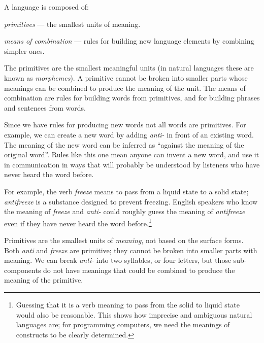 A language is composed of:
\begin{itemtight}
\item \emph{primitives} --- the smallest units of meaning.  
\item \emph{means of combination} --- rules for building new language elements by combining simpler ones.
\end{itemtight}

The primitives are the smallest meaningful units (in natural languages these are known as \emph{morphemes}).  A primitive cannot be broken into smaller parts whose meanings can be combined to produce the meaning of the unit.  The means of combination are rules for building words from primitives, and for building phrases and sentences from words.

Since we have rules for producing new words not all words are primitives.  For example, we can create a new word by adding \emph{anti-} in front of an existing word.  The meaning of the new word can be inferred as ``against the meaning of the original word''.  Rules like this one mean anyone can invent a new word, and use it in communication in ways that will probably be understood by listeners who have never heard the word before.   

For example, the verb \emph{freeze} means to pass from a liquid state to a solid state; \emph{antifreeze} is a substance designed to prevent freezing.  English speakers who know the meaning of \emph{freeze} and \emph{anti-} could roughly guess the meaning of \emph{antifreeze} even if they have never heard the word before.\footnote{Guessing that it is a verb meaning to pass from the solid to liquid state would also be reasonable.  This shows how imprecise and ambiguous natural languages are; for programming computers, we need the meanings of constructs to be clearly determined.}

Primitives are the smallest units of \emph{meaning}, not based on the surface forms.  Both \emph{anti} and \emph{freeze} are primitive; they cannot be broken into smaller parts with meaning.  We can break \emph{anti-} into two syllables, or four letters, but those sub-components do not have meanings that could be combined to produce the meaning of the primitive.  

